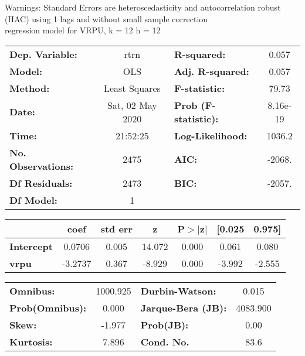 Warnings: \newline
 [1] Standard Errors are heteroscedasticity and autocorrelation robust (HAC) using 1 lags and without small sample correction\\ 

regression model for VRPU, k = 12 h = 12\begin{center}
\begin{tabular}{lclc}
\toprule
\textbf{Dep. Variable:}    &       rtrn       & \textbf{  R-squared:         } &     0.057   \\
\textbf{Model:}            &       OLS        & \textbf{  Adj. R-squared:    } &     0.057   \\
\textbf{Method:}           &  Least Squares   & \textbf{  F-statistic:       } &     79.73   \\
\textbf{Date:}             & Sat, 02 May 2020 & \textbf{  Prob (F-statistic):} &  8.16e-19   \\
\textbf{Time:}             &     21:52:25     & \textbf{  Log-Likelihood:    } &    1036.2   \\
\textbf{No. Observations:} &        2475      & \textbf{  AIC:               } &    -2068.   \\
\textbf{Df Residuals:}     &        2473      & \textbf{  BIC:               } &    -2057.   \\
\textbf{Df Model:}         &           1      & \textbf{                     } &             \\
\bottomrule
\end{tabular}
\begin{tabular}{lcccccc}
                   & \textbf{coef} & \textbf{std err} & \textbf{z} & \textbf{P$> |$z$|$} & \textbf{[0.025} & \textbf{0.975]}  \\
\midrule
\textbf{Intercept} &       0.0706  &        0.005     &    14.072  &         0.000        &        0.061    &        0.080     \\
\textbf{vrpu}      &      -3.2737  &        0.367     &    -8.929  &         0.000        &       -3.992    &       -2.555     \\
\bottomrule
\end{tabular}
\begin{tabular}{lclc}
\textbf{Omnibus:}       & 1000.925 & \textbf{  Durbin-Watson:     } &    0.015  \\
\textbf{Prob(Omnibus):} &   0.000  & \textbf{  Jarque-Bera (JB):  } & 4083.900  \\
\textbf{Skew:}          &  -1.977  & \textbf{  Prob(JB):          } &     0.00  \\
\textbf{Kurtosis:}      &   7.896  & \textbf{  Cond. No.          } &     83.6  \\
\bottomrule
\end{tabular}
\end{center}

